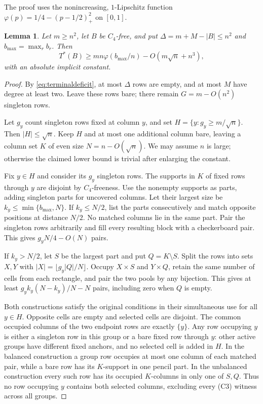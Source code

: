 \documentclass[11pt]{article}
\newtheorem{lemma}[theorem]{Lemma}
\begin{document}
The proof uses the nonincreasing, $1$-Lipschitz function
$\varphi(p)=1/4-(p-1/2)_+^2$ on $[0,1]$.

\begin{lemma}\label{lem:largerowdeficit}
Let $m\ge n^2$, let $B$ be $C_4$-free, and put
$\Delta=m+M-|B|\le n^2$ and $b_{\max}=\max_r b_r$.
Then
\[
 T^*(B)\ge mn\varphi(b_{\max}/n)-O(m\sqrt n+n^3),
\]
with an absolute implicit constant.
\end{lemma}
\begin{proof}
By \eqref{eq:terminaldeficit}, at most $\Delta$ rows are empty,
and at most $M$ have degree at least two. Leave these rows bare;
there remain $G=m-O(n^2)$ singleton rows.

Let $g_y$ count singleton rows fixed at column $y$, and set
$H=\{y:g_y\ge m/\sqrt n\}$. Then $|H|\le\sqrt n$.
Keep $H$ and at most one additional column bare, leaving a column
set $K$ of even size $N=n-O(\sqrt n)$. We may assume $n$ is large;
otherwise the claimed lower bound is trivial after enlarging the constant.

Fix $y\in H$ and consider its $g_y$ singleton rows. The supports in
$K$ of fixed rows through $y$ are disjoint by $C_4$-freeness.
Use the nonempty supports as parts, adding singleton parts for uncovered
columns. Let their largest size be $k_y\le\min\{b_{\max},N\}$.
If $k_y\le N/2$, list the parts consecutively and match opposite
positions at distance $N/2$. No matched columns lie in the same part.
Pair the singleton rows arbitrarily and fill every resulting block
with a checkerboard pair. This gives $g_yN/4-O(N)$ pairs.

If $k_y>N/2$, let $S$ be the largest part and put $Q=K\setminus S$.
Split the rows into sets $X,Y$ with $|X|=\lfloor g_y|Q|/N\rfloor$.
Occupy $X\times S$ and $Y\times Q$, retain the same number of cells
from each rectangle, and pair the two pools by any bijection. This gives
at least $g_y k_y(N-k_y)/N-N$ pairs, including zero when $Q$ is empty.

Both constructions satisfy the original conditions in their simultaneous
use for all $y\in H$. Opposite cells are empty and selected cells are
disjoint. The common occupied columns of the two endpoint rows are
exactly $\{y\}$. Any row occupying $y$ is either a singleton row in
this group or a bare fixed row through $y$: other active groups have
different fixed anchors, and no selected cell is added in $H$.
In the balanced construction a group row occupies at most one column
of each matched pair, while a bare row has its $K$-support in one pencil
part. In the unbalanced construction every such row has its occupied
$K$-columns in only one of $S,Q$. Thus no row occupying $y$ contains both selected
columns, excluding every (C3) witness across all groups.


\end{proof}
\end{document}
